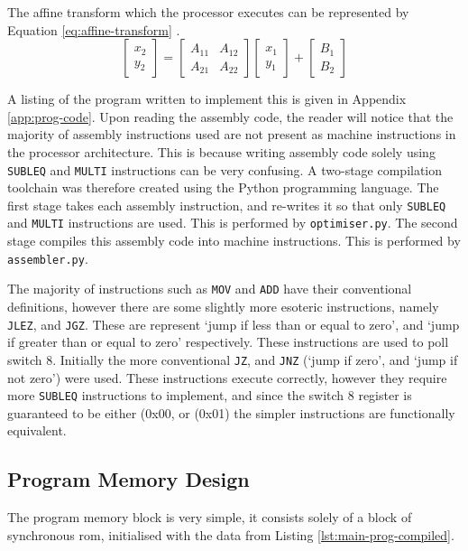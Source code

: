 The affine transform which the processor executes can be represented by Equation \ref{eq:affine-transform} \cite{kazmierski2017}.
\begin{equation}
\begin{bmatrix}
x_2\\
y_2
\end{bmatrix}
=
\begin{bmatrix}
A_{11} & A_{12}\\
A_{21} & A_{22}
\end{bmatrix}
\begin{bmatrix}
x_1\\
y_1
\end{bmatrix}
+
\begin{bmatrix}
B_1\\
B_2
\end{bmatrix}
\label{eq:affine-transform}
\end{equation}

A listing of the program written to implement this is given in Appendix \ref{app:prog-code}. Upon reading the assembly code, the reader will notice that the majority of assembly instructions used are not present as machine instructions in the processor architecture. This is because writing assembly code solely using \texttt{SUBLEQ} and \texttt{MULTI} instructions can be very confusing. A two-stage compilation toolchain was therefore created using the Python programming language. The first stage takes each assembly instruction, and re-writes it so that only \texttt{SUBLEQ} and \texttt{MULTI} instructions are used. This is performed by \texttt{optimiser.py}. The second stage compiles this assembly code into machine instructions. This is performed by \texttt{assembler.py}.

The majority of instructions such as \texttt{MOV} and \texttt{ADD} have their conventional definitions, however there are some slightly more esoteric instructions, namely \texttt{JLEZ}, and \texttt{JGZ}. These are represent `jump if less than or equal to zero', and `jump if greater than or equal to zero' respectively. These instructions are used to poll switch 8. Initially the more conventional \texttt{JZ}, and \texttt{JNZ} (`jump if zero', and `jump if not zero') were used. These instructions execute correctly, however they require more \texttt{SUBLEQ} instructions to implement, and since the switch 8 register is guaranteed to be either (0x00, or (0x01) the simpler instructions are functionally equivalent.

\subsection{Program Memory Design}
The program memory block is very simple, it consists solely of a block of synchronous \gls{rom}, initialised with the data from Listing \ref{lst:main-prog-compiled}.

